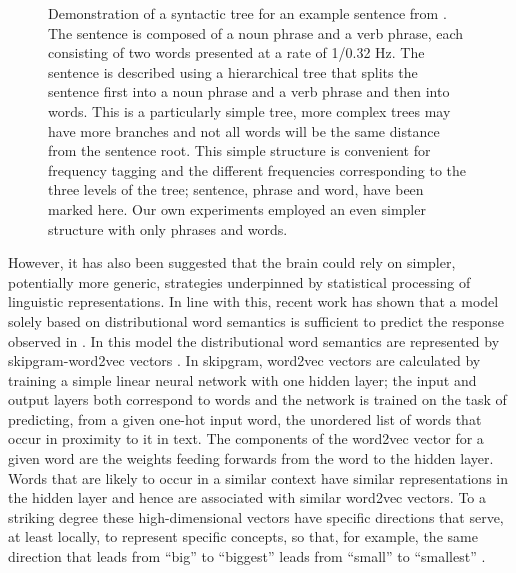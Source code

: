 \documentclass[10pt,letterpaper]{article}
\begin{document}
\begin{figure}[tb]
\begin{center}
\end{center}
\caption{Demonstration of a syntactic tree for an example sentence
  from \cite{DingEtAl2016, DingEtAl2017}. The sentence is composed of
  a noun phrase and a verb phrase, each consisting of two words
  presented at a rate of 1/0.32 Hz.  The sentence is described using a
  hierarchical tree that splits the sentence first into a noun phrase
  and a verb phrase and then into words. This is a particularly simple
  tree, more complex trees may have more branches and not all words
  will be the same distance from the sentence root. This simple
  structure is convenient for frequency tagging and the different
  frequencies corresponding to the three levels of the tree; sentence,
  phrase and word, have been marked here. Our own experiments employed
  an even simpler structure with only phrases and words.}
\label{fig:freq_tree}
\end{figure}


However, it has also been suggested that the brain could rely on
simpler, potentially more generic, strategies underpinned by
statistical processing of linguistic representations. In line with
this, recent work \cite{FrankYang2018} has shown that a model solely
based on distributional word semantics is sufficient to predict the
response observed in \cite{DingEtAl2016, DingEtAl2017}. In this model
the distributional word semantics are represented by skipgram-word2vec
vectors \cite{MikolovEtAl2013,Bojanowski2017}. In skipgram, word2vec
vectors are calculated by training a simple linear neural network with
one hidden layer; the input and output layers both correspond to words
and the network is trained on the task of predicting, from a given
one-hot input word, the unordered list of words that occur in
proximity to it in text. The components of the word2vec vector for a
given word are the weights feeding forwards from the word to the
hidden layer. Words that are likely to occur in a similar context have
similar representations in the hidden layer and hence are associated
with similar word2vec vectors. To a striking degree these
high-dimensional vectors have specific directions that serve, at least
locally, to represent specific concepts, so that, for example, the
same direction that leads from ``big'' to ``biggest'' leads from
``small'' to ``smallest'' \cite{MikolovEtAl2013b, MikolovEtAl2013c}.
\end{document}
